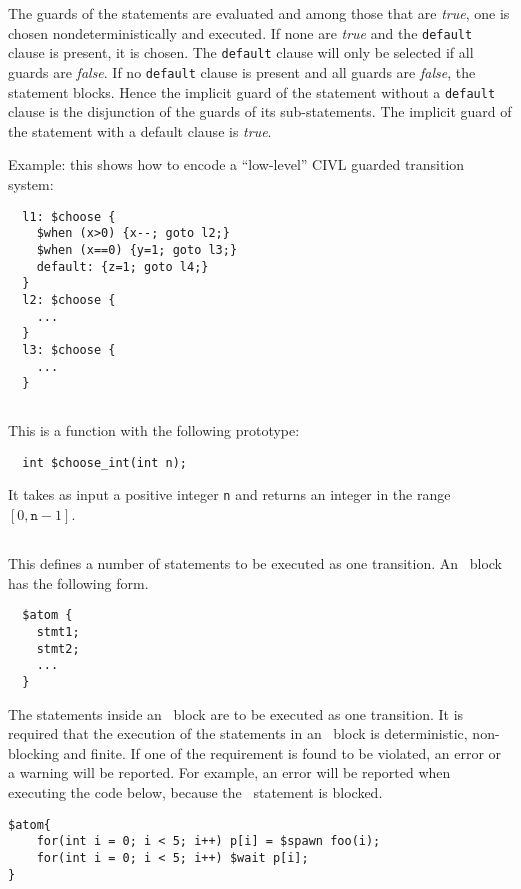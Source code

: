 \documentclass[11pt]{book}
\begin{document}
The guards of the statements are evaluated and among those that are
\emph{true}, one is chosen nondeterministically and executed.  If none
are \emph{true} and the \texttt{default} clause is present, it is
chosen.  The \texttt{default} clause will only be selected if all
guards are \emph{false}.  If no \texttt{default} clause is present and
all guards are \emph{false}, the statement blocks.  Hence the implicit
guard of the \cchoose{} statement without a \texttt{default} clause is
the disjunction of the guards of its sub-statements.  The implicit
guard of the \cchoose{} statement with a default clause is
\emph{true}.

Example: this shows how to encode a ``low-level'' CIVL guarded
transition system:

\begin{verbatim}
  l1: $choose {
    $when (x>0) {x--; goto l2;}
    $when (x==0) {y=1; goto l3;}
    default: {z=1; goto l4;}
  }
  l2: $choose {
    ...
  }
  l3: $choose {
    ...
  }
\end{verbatim}

\subsection{\cchooseint} This is a function with the following prototype:
\begin{verbatim}
  int $choose_int(int n);
\end{verbatim}
It takes as input a positive integer \texttt{n} and returns an integer
in the range $[0,\texttt{n}-1]$.  

\subsection{\catom} This defines a number of statements to be executed as one transition.  An \catom~block has the following form.
\begin{verbatim}
  $atom {
    stmt1;
    stmt2;
    ...
  }
\end{verbatim}

The statements inside an \catom~block are to be executed as one transition. It is required that the execution of the statements in an \catom~block is deterministic, non-blocking and finite. If one of the requirement is found to be violated, an error or a warning will be reported. For example, an error will be reported  when executing the code below, because the \cwait~statement is blocked.

\begin{verbatim}  
$atom{
    for(int i = 0; i < 5; i++) p[i] = $spawn foo(i);
    for(int i = 0; i < 5; i++) $wait p[i];
}
\end{verbatim}
\end{document}
